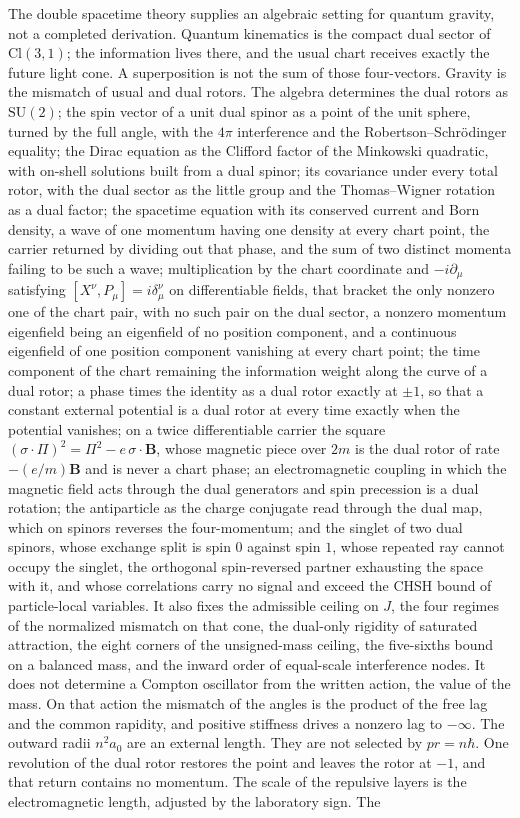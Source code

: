 \documentclass[a4paper]{article}
\begin{document}
The double spacetime theory supplies an algebraic setting for quantum gravity, not a completed derivation. Quantum kinematics is the compact dual sector of $\mathrm{Cl}(3,1)$; the information lives there, and the usual chart receives exactly the future light cone. A superposition is not the sum of those four-vectors. Gravity is the mismatch of usual and dual rotors. The algebra determines the dual rotors as $\mathrm{SU}(2)$; the spin vector of a unit dual spinor as a point of the unit sphere, turned by the full angle, with the $4\pi$ interference and the Robertson--Schrödinger equality; the Dirac equation as the Clifford factor of the Minkowski quadratic, with on-shell solutions built from a dual spinor; its covariance under every total rotor, with the dual sector as the little group and the Thomas--Wigner rotation as a dual factor; the spacetime equation with its conserved current and Born density, a wave of one momentum having one density at every chart point, the carrier returned by dividing out that phase, and the sum of two distinct momenta failing to be such a wave; multiplication by the chart coordinate and $-i\partial_\mu$ satisfying $[X^\nu,P_\mu]=i\delta^\nu_\mu$ on differentiable fields, that bracket the only nonzero one of the chart pair, with no such pair on the dual sector, a nonzero momentum eigenfield being an eigenfield of no position component, and a continuous eigenfield of one position component vanishing at every chart point; the time component of the chart remaining the information weight along the curve of a dual rotor; a phase times the identity as a dual rotor exactly at $\pm 1$, so that a constant external potential is a dual rotor at every time exactly when the potential vanishes; on a twice differentiable carrier the square $(\sigma\cdot\Pi)^2=\Pi^2-e\,\sigma\cdot\mathbf B$, whose magnetic piece over $2m$ is the dual rotor of rate $-(e/m)\mathbf B$ and is never a chart phase; an electromagnetic coupling in which the magnetic field acts through the dual generators and spin precession is a dual rotation; the antiparticle as the charge conjugate read through the dual map, which on spinors reverses the four-momentum; and the singlet of two dual spinors, whose exchange split is spin $0$ against spin $1$, whose repeated ray cannot occupy the singlet, the orthogonal spin-reversed partner exhausting the space with it, and whose correlations carry no signal and exceed the CHSH bound of particle-local variables. It also fixes the admissible ceiling on $J$, the four regimes of the normalized mismatch on that cone, the dual-only rigidity of saturated attraction, the eight corners of the unsigned-mass ceiling, the five-sixths bound on a balanced mass, and the inward order of equal-scale interference nodes. It does not determine a Compton oscillator from the written action, the value of the mass. On that action the mismatch of the angles is the product of the free lag and the common rapidity, and positive stiffness drives a nonzero lag to $-\infty$. The outward radii $n^2 a_0$ are an external length. They are not selected by $pr=n\hbar$. One revolution of the dual rotor restores the point and leaves the rotor at $-1$, and that return contains no momentum. The scale of the repulsive layers is the electromagnetic length, adjusted by the laboratory sign. The 
\end{document}
